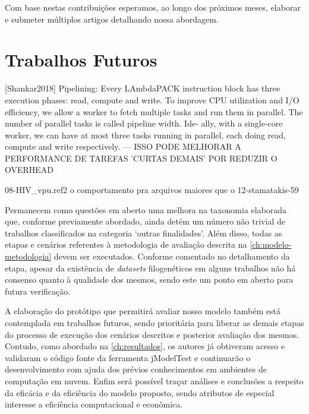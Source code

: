 \documentclass[english,brazilian]{UNISINOSmonografia} %
\begin{document}
Com base nestas contribuições esperamos, ao longo dos próximos meses, elaborar e submeter múltiplos artigos detalhando nossa abordagem.



\section{Trabalhos Futuros}


[Shankar2018]
Pipelining: Every LAmbdaPACK instruction block has three execution phases: read, compute and write. To improve CPU utilization and I/O efficiency, we allow a worker to fetch multiple tasks and run them in parallel. The number of parallel tasks is called pipeline width. Ide- ally, with a single-core worker, we can have at most three tasks running in parallel, each doing read, compute and write respectively.
	--- ISSO PODE MELHORAR A PERFORMANCE DE TAREFAS 'CURTAS DEMAIS' POR REDUZIR O OVERHEAD





08-HIV\_vpu.ref2
o comportamento pra arquivos maiores que o 12-stamatakis-59




Permanecem como questões em aberto uma melhora na taxonomia elaborada que, conforme previamente abordado, ainda detém um número não trivial de trabalhos classificados na categoria \textquoteleft outras finalidades\textquoteright.
Além disso, todas as etapas e cenários referentes à metodologia de avaliação descrita na \autoref{ch:modelo-metodologia} devem ser executados.
Conforme comentado no detalhamento da etapa, apesar da existência de \textit{datasets} filogenéticos em alguns trabalhos não há consenso quanto à qualidade dos mesmos, sendo este um ponto em aberto para futura verificação.


A elaboração do protótipo que permitirá avaliar nosso modelo também está contemplada em trabalhos futuros, sendo prioritária para liberar as demais etapas do processo de execução dos cenários descritos e posterior avaliação dos mesmos.
Contudo, como abordado na \autoref{ch:resultados}, os autores já obtiveram acesso e validaram o código fonte da ferramenta jModelTest e continuarão o desenvolvimento com ajuda dos prévios conhecimentos em ambientes de computação em nuvem.
Enfim será possível traçar análises e conclusões a respeito da eficácia e da eficiência do modelo proposto, sendo atributos de especial interesse a eficiência computacional e econômica.
\end{document}
